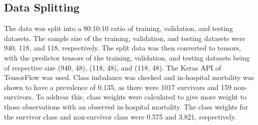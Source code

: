 \documentclass[10pt]{article}
\begin{document}
\begin{multicols}{2}
\section{Data Splitting}
The data was split into a 80:10:10 ratio of training, validation, and testing datasets. The sample size of the training, validation, and testing datasets were 940, 118, and 118, respectively. The split data was then converted to tensors, with the predictor tensors of the training, validation, and testing datasets being of respective size (940, 48), (118, 48), and (118, 48). The Keras API of TensorFlow was used. Class imbalance was checked and in-hospital mortality was shown to have a prevalence of 0.135, as there were 1017 survivors and 159 non-survivors. To address this, class weights were calculated to give more weight to those observations with an observed in-hospital mortality. The class weights for the survivor class and non-survivor class were 0.575 and 3.821, respectively.


\end{multicols}
\end{document}
